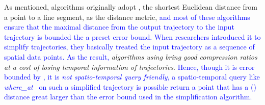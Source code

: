 As mentioned, \lsa algorithms originally adopt \ped, {the shortest Euclidean distance from a point to a line segment, as the distance metric, \textcolor{blue}{and most of these algorithms ensure that the maximal distance from the output trajectory to the input trajectory is bounded the a preset \ped error bound. When researchers introduced it to simplify trajectories, they basically treated the input trajectory as a sequence of spatial data points. As the result,} \emph{\lsa algorithms using \ped bring good compression ratios~\cite{Douglas:Peucker, Hershberger:Speeding, Liu:BQS, Muckell:Compression, Chen:Trajectory, Cao:Spatio, Shi:Survey} at a cost of losing temporal information of trajectories}.} \textcolor{blue}{Hence, though it is error bounded by \ped, it is \emph{not spatio-temporal query friendly}, \ie a spatio-temporal query like \emph{where\_at}~\cite{Cao:Spatio} on such a simplified trajectory is possible return a point that has a (\sed) distance great larger than the \ped error bound used in the simplification algorithm.}

